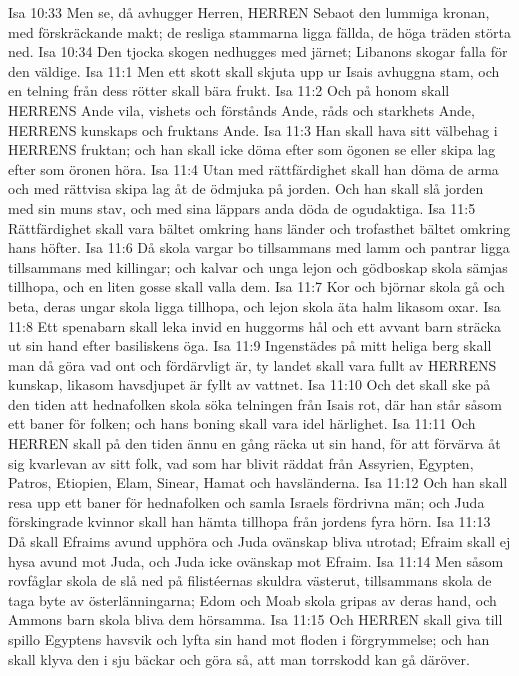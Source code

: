 Isa 10:33  Men se, då avhugger Herren, HERREN Sebaot den lummiga kronan, med förskräckande makt; de resliga stammarna ligga fällda, de höga träden störta ned.
Isa 10:34  Den tjocka skogen nedhugges med järnet; Libanons skogar falla för den väldige.
Isa 11:1  Men ett skott skall skjuta upp ur Isais avhuggna stam, och en telning från dess rötter skall bära frukt.
Isa 11:2  Och på honom skall HERRENS Ande vila, vishets och förstånds Ande, råds och starkhets Ande, HERRENS kunskaps och fruktans Ande.
Isa 11:3  Han skall hava sitt välbehag i HERRENS fruktan; och han skall icke döma efter som ögonen se eller skipa lag efter som öronen höra.
Isa 11:4  Utan med rättfärdighet skall han döma de arma och med rättvisa skipa lag åt de ödmjuka på jorden. Och han skall slå jorden med sin muns stav, och med sina läppars anda döda de ogudaktiga.
Isa 11:5  Rättfärdighet skall vara bältet omkring hans länder och trofasthet bältet omkring hans höfter.
Isa 11:6  Då skola vargar bo tillsammans med lamm och pantrar ligga tillsammans med killingar; och kalvar och unga lejon och gödboskap skola sämjas tillhopa, och en liten gosse skall valla dem.
Isa 11:7  Kor och björnar skola gå och beta, deras ungar skola ligga tillhopa, och lejon skola äta halm likasom oxar.
Isa 11:8  Ett spenabarn skall leka invid en huggorms hål och ett avvant barn sträcka ut sin hand efter basiliskens öga.
Isa 11:9  Ingenstädes på mitt heliga berg skall man då göra vad ont och fördärvligt är, ty landet skall vara fullt av HERRENS kunskap, likasom havsdjupet är fyllt av vattnet.
Isa 11:10  Och det skall ske på den tiden att hednafolken skola söka telningen från Isais rot, där han står såsom ett baner för folken; och hans boning skall vara idel härlighet.
Isa 11:11  Och HERREN skall på den tiden ännu en gång räcka ut sin hand, för att förvärva åt sig kvarlevan av sitt folk, vad som har blivit räddat från Assyrien, Egypten, Patros, Etiopien, Elam, Sinear, Hamat och havsländerna.
Isa 11:12  Och han skall resa upp ett baner för hednafolken och samla Israels fördrivna män; och Juda förskingrade kvinnor skall han hämta tillhopa från jordens fyra hörn.
Isa 11:13  Då skall Efraims avund upphöra och Juda ovänskap bliva utrotad; Efraim skall ej hysa avund mot Juda, och Juda icke ovänskap mot Efraim.
Isa 11:14  Men såsom rovfåglar skola de slå ned på filistéernas skuldra västerut, tillsammans skola de taga byte av österlänningarna; Edom och Moab skola gripas av deras hand, och Ammons barn skola bliva dem hörsamma.
Isa 11:15  Och HERREN skall giva till spillo Egyptens havsvik och lyfta sin hand mot floden i förgrymmelse; och han skall klyva den i sju bäckar och göra så, att man torrskodd kan gå däröver.
